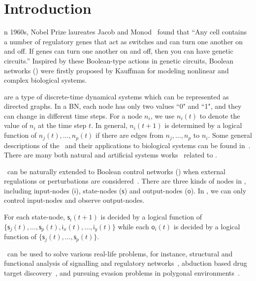 

\section{Introduction}
\label{sec:intro}


n 1960s, Nobel Prize laureates Jacob and Monod~\cite{Jacob1961Genetic} found that ``Any cell contains a number of regulatory genes that act as switches and can turn one another on and off. If genes can turn one another on and off, then you can have genetic circuits.'' Inspired by these Boolean-type actions in genetic circuits, Boolean networks (\BNs) were firstly proposed by Kauffman \cite{Kauffman1968Metabolic} for modeling nonlinear and complex biological systems. 

{\BNs} are a type of discrete-time dynamical systems which can be represented as directed graphs. In a BN, each node has only two values ``0" and ``1", and they can change in different time steps.  For a node $n_i$, we use $n_i(t)$ to denote the value of $n_i$ at the time step $t$.
In general, $n_i(t+1)$ is determined by a logical function of $n_j(t),\ldots,n_p(t)$ if  there are  edges from $n_j,\ldots,n_p$ to $n_i$.  
Some general descriptions of the \BNs\ and their applications to biological systems can be found in~\cite{Kauffman1968Metabolic}. There are many both natural and artificial systems works~\cite{Akutsu2000Inferring, Shmulevich2002From, Faur2006Dynamical,Green2007The,Lou2010Multi} related to \BNs.
 

\BNs\ can be naturally extended to Boolean control networks (\BCNs) when external regulations or perturbations are considered~\cite{Ideker2001A}. There are three kinds of nodes in \BCNs, including input-nodes ($\mathsf{i}$), state-nodes ($\mathsf{s}$) and output-nodes ($\mathsf{o}$). In \BCNs, we can only control input-nodes and observe output-nodes. 

For each state-node, $\mathsf{s}_i(t+1)$ is decided by a logical function of  $\{\mathsf{s}_j(t),\ldots,\mathsf{s}_p(t),\mathsf{i}_x(t),\ldots,\mathsf{i}_y(t)\}$  %
while each $\mathsf{o}_i(t)$ is decided by a logical function of   $\{\mathsf{s}_j(t),\ldots,\mathsf{s}_p(t)\}$. 

\BCNs\ can be used to solve various real-life problems, for instance, 
structural and functional analysis of signalling and regulatory networks~\cite{Kaufman1999A, Klamt2006A}, 
abduction based drug target discovery~\cite{Biane2017Abduction}, 
and pursuing evasion problems in polygonal environments~\cite{Thunberg2011A}. 

